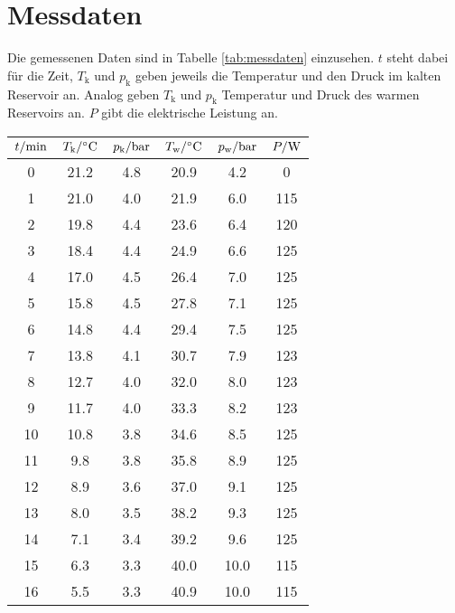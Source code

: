 \section{Messdaten}
Die gemessenen Daten sind in Tabelle \ref{tab:messdaten} einzusehen. 
$t$ steht dabei für die Zeit, $T_\text{k}$ und $p_\text{k}$ geben jeweils die Temperatur und den Druck im kalten Reservoir an.
Analog geben $T_\text{k}$ und $p_\text{k}$ Temperatur und Druck des warmen Reservoirs an. 
$P$ gibt die elektrische Leistung an.

\begin{table}
    \centering
    \begin{tabular}[]{S[table-format=2.0] S S[table-format=1.1] S S S[table-format=3.0]}
        \toprule
        {$t / \unit[]{\minute}$} & {$T_\text{k} / \unit[]{\degreeCelsius}$} & {$p_\text{k} / \unit[]{\bar}$} & {$T_\text{w} / \unit[]{\degreeCelsius}$} & {$p_\text{w} / \unit[]{\bar}$} & {$P / \unit[]{\watt}$} \\
         & 21.2  &  4.8 & 20.9  &   4.2  &  0   \\  
        1 & 21.0  &  4.0 & 21.9  &   6.0  &  115 \\
        2 & 19.8  &  4.4 & 23.6  &   6.4  &  120 \\
        3 & 18.4  &  4.4 & 24.9  &   6.6  &  125 \\
        4 & 17.0  &  4.5 & 26.4  &   7.0  &  125 \\
        5 & 15.8  &  4.5 & 27.8  &   7.1  &  125 \\
        6 & 14.8  &  4.4 & 29.4  &   7.5  &  125 \\
        7 & 13.8  &  4.1 & 30.7  &   7.9  &  123 \\
        8 & 12.7  &  4.0 & 32.0  &   8.0  &  123 \\
        9 & 11.7  &  4.0 & 33.3  &   8.2  &  123 \\
       10 & 10.8  &  3.8 & 34.6  &   8.5  &  125 \\
       11 &  9.8  &  3.8 & 35.8  &   8.9  &  125 \\
       12 &  8.9  &  3.6 & 37.0  &   9.1  &  125 \\
       13 &  8.0  &  3.5 & 38.2  &   9.3  &  125 \\
       14 &  7.1  &  3.4 & 39.2  &   9.6  &  125 \\
       15 &  6.3  &  3.3 & 40.0  &  10.0  &  115 \\
       16 &  5.5  &  3.3 & 40.9  &  10.0  &  115 \\

\end{tabular}
\end{table}
